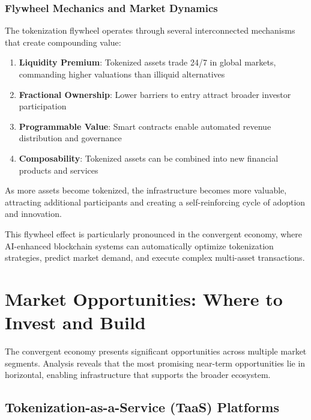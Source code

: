 \documentclass[11pt,a4paper]{report}
\begin{document}
\vspace{0.5cm}

\subsection{Flywheel Mechanics and Market Dynamics}

The tokenization flywheel operates through several interconnected mechanisms that create compounding value:

\begin{enumerate}
    \item \textbf{Liquidity Premium}: Tokenized assets trade 24/7 in global markets, commanding higher valuations than illiquid alternatives
    \item \textbf{Fractional Ownership}: Lower barriers to entry attract broader investor participation
    \item \textbf{Programmable Value}: Smart contracts enable automated revenue distribution and governance
    \item \textbf{Composability}: Tokenized assets can be combined into new financial products and services
\end{enumerate}

\begin{keypoint}
As more assets become tokenized, the infrastructure becomes more valuable, attracting additional participants and creating a self-reinforcing cycle of adoption and innovation.
\end{keypoint}

This flywheel effect is particularly pronounced in the convergent economy, where AI-enhanced blockchain systems can automatically optimize tokenization strategies, predict market demand, and execute complex multi-asset transactions.

\chapter{Market Opportunities: Where to Invest and Build}

The convergent economy presents significant opportunities across multiple market segments. Analysis reveals that the most promising near-term opportunities lie in horizontal, enabling infrastructure that supports the broader ecosystem.

\section{Tokenization-as-a-Service (TaaS) Platforms}
\end{document}
